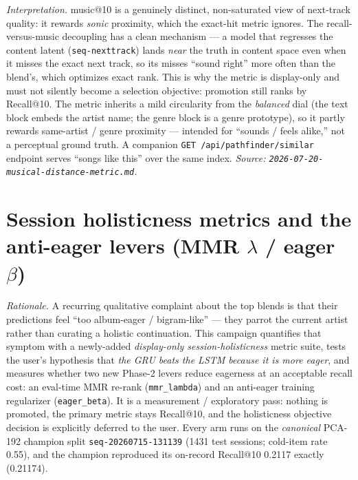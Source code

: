 \documentclass[11pt]{article}
\newcommand{\dsid}[1]{\texttt{\small #1}}
\begin{document}
\emph{Interpretation.} music@10 is a genuinely distinct, non-saturated view of
next-track quality: it rewards \emph{sonic} proximity, which the exact-hit metric
ignores. The recall-versus-music decoupling has a clean mechanism --- a model that
regresses the content latent (\texttt{seq-nexttrack}) lands \emph{near} the truth
in content space even when it misses the exact next track, so its misses
``sound right'' more often than the blend's, which optimizes exact rank. This is
why the metric is display-only and must not silently become a selection objective:
promotion still ranks by Recall@10. The metric inherits a mild circularity from the
\emph{balanced} dial (the text block embeds the artist name; the genre block is a
genre prototype), so it partly rewards same-artist / genre proximity --- intended
for ``sounds / feels alike,'' not a perceptual ground truth. A companion
\texttt{GET /api/pathfinder/similar} endpoint serves ``songs like this'' over the
same index.
\emph{Source: \texttt{2026-07-20-musical-distance-metric.md}.}

\section{Session holisticness metrics and the anti-eager levers (MMR $\lambda$ / eager $\beta$)}
\label{sec:holisticness}
\emph{Rationale.} A recurring qualitative complaint about the top blends is that
their predictions feel ``too album-eager / bigram-like'' --- they parrot the
current artist rather than curating a holistic continuation. This campaign
quantifies that symptom with a newly-added \emph{display-only session-holisticness}
metric suite, tests the user's hypothesis that \emph{the GRU beats the LSTM because
it is more eager}, and measures whether two new Phase-2 levers reduce eagerness at
an acceptable recall cost: an eval-time MMR re-rank (\texttt{mmr\_lambda}) and an
anti-eager training regularizer (\texttt{eager\_beta}). It is a measurement /
exploratory pass: nothing is promoted, the primary metric stays Recall@10, and the
holisticness objective decision is explicitly deferred to the user. Every arm runs
on the \emph{canonical} PCA-192 champion split \dsid{seq-20260715-131139}
(\num{1431} test sessions; cold-item rate \num{0.55}), and the champion reproduced
its on-record Recall@10 \num{0.2117} exactly (\num{0.21174}).
\end{document}
